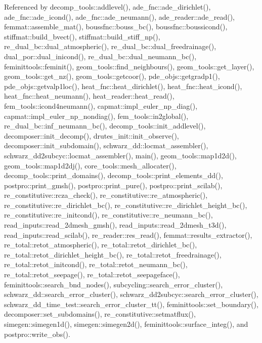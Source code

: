 Referenced by decomp\+\_\+tools\+::addlevel(), ade\+\_\+fnc\+::ade\+\_\+dirichlet(), ade\+\_\+fnc\+::ade\+\_\+icond(), ade\+\_\+fnc\+::ade\+\_\+neumann(), ade\+\_\+reader\+::ade\+\_\+read(), femmat\+::assemble\+\_\+mat(), boussfnc\+::bouss\+\_\+bc(), boussfnc\+::boussicond(), stiffmat\+::build\+\_\+bvect(), stiffmat\+::build\+\_\+stiff\+\_\+np(), re\+\_\+dual\+\_\+bc\+::dual\+\_\+atmospheric(), re\+\_\+dual\+\_\+bc\+::dual\+\_\+freedrainage(), dual\+\_\+por\+::dual\+\_\+inicond(), re\+\_\+dual\+\_\+bc\+::dual\+\_\+neumann\+\_\+bc(), feminittools\+::feminit(), geom\+\_\+tools\+::find\+\_\+neighbours(), geom\+\_\+tools\+::get\+\_\+layer(), geom\+\_\+tools\+::get\+\_\+nz(), geom\+\_\+tools\+::getcoor(), pde\+\_\+objs\+::getgradp1(), pde\+\_\+objs\+::getvalp1loc(), heat\+\_\+fnc\+::heat\+\_\+dirichlet(), heat\+\_\+fnc\+::heat\+\_\+icond(), heat\+\_\+fnc\+::heat\+\_\+neumann(), heat\+\_\+reader\+::heat\+\_\+read(), fem\+\_\+tools\+::icond4neumann(), capmat\+::impl\+\_\+euler\+\_\+np\+\_\+diag(), capmat\+::impl\+\_\+euler\+\_\+np\+\_\+nondiag(), fem\+\_\+tools\+::in2global(), re\+\_\+dual\+\_\+bc\+::inf\+\_\+neumann\+\_\+bc(), decomp\+\_\+tools\+::init\+\_\+addlevel(), decomposer\+::init\+\_\+decomp(), drutes\+\_\+init\+::init\+\_\+observe(), decomposer\+::init\+\_\+subdomain(), schwarz\+\_\+dd\+::locmat\+\_\+assembler(), schwarz\+\_\+dd2subcyc\+::locmat\+\_\+assembler(), main(), geom\+\_\+tools\+::map1d2d(), geom\+\_\+tools\+::map1d2dj(), core\+\_\+tools\+::mesh\+\_\+allocater(), decomp\+\_\+tools\+::print\+\_\+domains(), decomp\+\_\+tools\+::print\+\_\+elements\+\_\+dd(), postpro\+::print\+\_\+gmsh(), postpro\+::print\+\_\+pure(), postpro\+::print\+\_\+scilab(), re\+\_\+constitutive\+::rcza\+\_\+check(), re\+\_\+constitutive\+::re\+\_\+atmospheric(), re\+\_\+constitutive\+::re\+\_\+dirichlet\+\_\+bc(), re\+\_\+constitutive\+::re\+\_\+dirichlet\+\_\+height\+\_\+bc(), re\+\_\+constitutive\+::re\+\_\+initcond(), re\+\_\+constitutive\+::re\+\_\+neumann\+\_\+bc(), read\+\_\+inputs\+::read\+\_\+2dmesh\+\_\+gmsh(), read\+\_\+inputs\+::read\+\_\+2dmesh\+\_\+t3d(), read\+\_\+inputs\+::read\+\_\+scilab(), re\+\_\+reader\+::res\+\_\+read(), femmat\+::results\+\_\+extractor(), re\+\_\+total\+::retot\+\_\+atmospheric(), re\+\_\+total\+::retot\+\_\+dirichlet\+\_\+bc(), re\+\_\+total\+::retot\+\_\+dirichlet\+\_\+height\+\_\+bc(), re\+\_\+total\+::retot\+\_\+freedrainage(), re\+\_\+total\+::retot\+\_\+initcond(), re\+\_\+total\+::retot\+\_\+neumann\+\_\+bc(), re\+\_\+total\+::retot\+\_\+seepage(), re\+\_\+total\+::retot\+\_\+seepageface(), feminittools\+::search\+\_\+bnd\+\_\+nodes(), subcycling\+::search\+\_\+error\+\_\+cluster(), schwarz\+\_\+dd\+::search\+\_\+error\+\_\+cluster(), schwarz\+\_\+dd2subcyc\+::search\+\_\+error\+\_\+cluster(), schwarz\+\_\+dd\+\_\+time\+\_\+test\+::search\+\_\+error\+\_\+cluster\+\_\+tt(), feminittools\+::set\+\_\+boundary(), decomposer\+::set\+\_\+subdomains(), re\+\_\+constitutive\+::setmatflux(), simegen\+::simegen1d(), simegen\+::simegen2d(), feminittools\+::surface\+\_\+integ(), and postpro\+::write\+\_\+obs().



